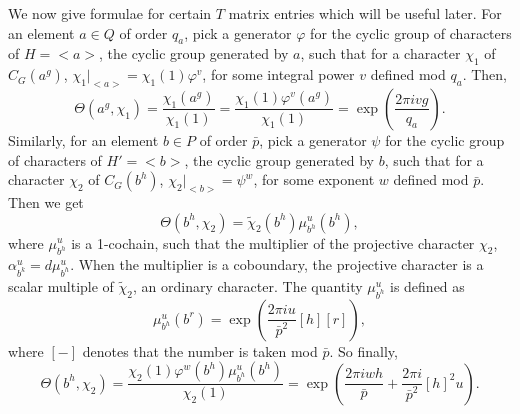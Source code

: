 \documentclass[11pt]{book}
\theoremstyle{Rem}
\theoremstyle{definition}
\numberwithin{equation}{section}
\newcommand{\pb}{\bar{p}}
\newcommand{\qb}{q_a}
\begin{document}
We now give formulae for certain $T$ matrix entries which will be useful later. For an element $a\in Q$ of order $\qb$, pick a generator $\varphi$ for the cyclic group of characters of $H=<a>$, the cyclic group generated by $a$, such that for a character $\chi_1$ of $C_G(a^g)$, $\chi_1|_{<a>} = \chi_1(1)\varphi^v$, for  some integral power $v$ defined mod $\qb$. Then,
 \begin{equation}\label{a}
	  \Theta(a^{g}, \chi_1) = \frac{\chi_1(a^{g})}{\chi_1(1)}
	= \frac{\chi_1(1)\varphi^v(a^{g})}{\chi_1(1)} 
	= \exp(\frac{2\pi iv g}{\qb}).
	\end{equation}
 Similarly, for an element $b\in P$ of order $\pb$, pick a generator $\psi$ for the cyclic group of characters of $H'=<b>$, the cyclic group generated by $b$, such that for a character $\chi_2$ of $C_G(b^h)$, $\chi_2|_{<b>} = \psi^w$, for some exponent $w$ defined mod $\pb$. Then we get
 \begin{equation}
	 \Theta(b^{h}, \chi_2) = \tilde{\chi}_2(b^{h})\mu^u_{b^h}(b^h),
	 \end{equation}
where $\mu^u_{b^h}$ is a 1-cochain, such that the multiplier of the projective character $\chi_2$, $\alpha_{b^k}^u = d\mu^u_{b^h}$. When the multiplier is a coboundary, the projective character is a scalar multiple of $\tilde{\chi}_2$, an ordinary character.  The quantity $\mu^u_{b^h}$ is defined as \begin{equation}
	\mu_{b^h}^u (b^r) = \exp(\frac{2\pi iu}{\pb^2}[h][r]),
\end{equation}
where $[-]$ denotes that the number is taken mod $\pb$. So finally,
\begin{equation}
	 \Theta(b^{h}, \chi_2)	 = \frac{\chi_2(1)\varphi^w (b^{h})\mu^u_{b^h}(b^h)}{\chi_2(1)} 
	 =\exp (\frac{2\pi iwh}{\pb} + \frac{2\pi i}{\pb^2}[h]^2u).
\end{equation}
\end{document}

